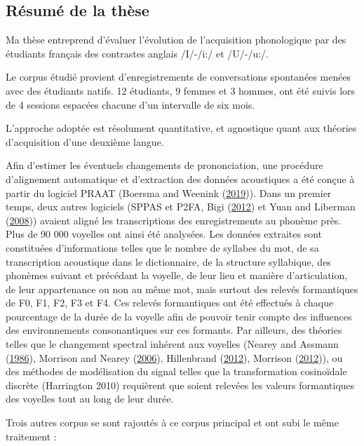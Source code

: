 \documentclass[
  10pt,
]{article}
\begin{document}
\hypertarget{ruxe9sumuxe9-de-la-thuxe8se}{%
\subsection{Résumé de la thèse}\label{ruxe9sumuxe9-de-la-thuxe8se}}

Ma thèse entreprend d'évaluer l'évolution de l'acquisition phonologique par des étudiants français
des contrastes anglais /I/-/i:/ et /U/-/u:/.

Le corpus étudié provient d'enregistrements de conversations spontanées menées avec des étudiants natifs. 12 étudiants, 9 femmes et 3 hommes, ont été suivis lors de 4 sessions espacées
chacune d'un intervalle de six mois.

L'approche adoptée est résolument quantitative, et agnostique quant aux théories d'acquisition
d'une deuxième langue.

Afin d'estimer les éventuels changements de prononciation, une procédure d'alignement automatique et d'extraction des données acoustiques a été conçue à partir du logiciel PRAAT (Boersma and Weenink (\protect\hyperlink{ref-praat}{2019})). Dans un premier temps, deux autres logiciels (SPPAS et P2FA, Bigi (\protect\hyperlink{ref-sppas2012}{2012}) et Yuan and Liberman (\protect\hyperlink{ref-p2fa}{2008})) avaient aligné les transcriptions des enregistrements au phonème près. Plus de 90 000
voyelles ont ainsi été analysées. Les données extraites sont constituées d'informations telles que
le nombre de syllabes du mot, de sa transcription acoustique dans le dictionnaire, de la structure
syllabique, des phonèmes suivant et précédant la voyelle, de leur lieu et manière d'articulation, de
leur appartenance ou non au même mot, mais surtout des relevés formantiques de F0, F1, F2, F3
et F4. Ces relevés formantiques ont été effectués à chaque pourcentage de la durée de la voyelle
afin de pouvoir tenir compte des influences des environnements consonantiques sur ces formants.
Par ailleurs, des théories telles que le changement spectral inhérent aux voyelles (Nearey and Assmann (\protect\hyperlink{ref-nearey1986}{1986}), Morrison and Nearey (\protect\hyperlink{ref-morrison2006}{2006}), Hillenbrand (\protect\hyperlink{ref-hillenbrand2012}{2012}), Morrison (\protect\hyperlink{ref-morrison2012}{2012})), ou des méthodes
de modélisation du signal telles que la transformation cosinoïdale discrète (Harrington 2010) requièrent que soient relevées les valeurs formantiques des voyelles tout au long de leur durée.

Trois autres corpus se sont rajoutés à ce corpus principal et ont subi le même traitement :
\end{document}
